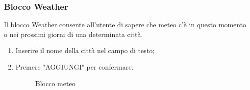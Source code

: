 \subsubsection{Blocco Weather}
Il blocco Weather consente all'utente di sapere che meteo c'è in questo momento o nei prossimi giorni di una determinata città.
\begin{enumerate}
	\item Inserire il nome della città nel campo di testo;
	\item Premere "AGGIUNGI" per confermare.
	\begin{figure}[!ht]
		\centering
		\caption{Blocco meteo}
	\end{figure}
\end{enumerate}
\newpage

